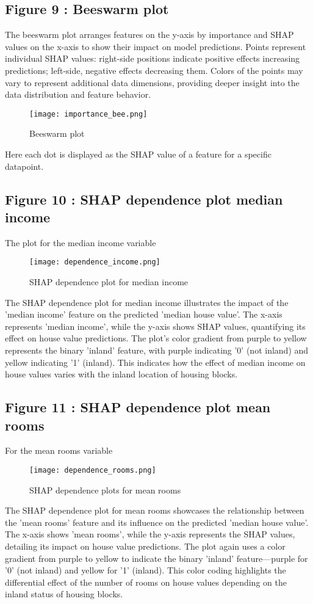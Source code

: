 \documentclass[12pt]{article}
\begin{document}
\newpage
\subsection{Figure 9 : Beeswarm plot}
The beeswarm plot arranges features on the y-axis by importance and SHAP values on the x-axis to show their impact on model predictions. Points represent individual SHAP values: right-side positions indicate positive effects increasing predictions; left-side, negative effects decreasing them. Colors of the points may vary to represent additional data dimensions, providing deeper insight into the data distribution and feature behavior.
\begin{figure}[H]
	\centering
	\texttt{[image: importance\_bee.png]}
	\caption{Beeswarm plot}
	\label{fig:shapbee}
\end{figure}
Here each dot is displayed as the SHAP value of a feature for a specific datapoint. 

\newpage

\subsection{Figure 10 : SHAP dependence plot median income}
The plot for the median income variable
\begin{figure}[H]
	\centering
	\texttt{[image: dependence\_income.png]}
	\caption{SHAP dependence plot for median income}
	\label{fig:depincome}
\end{figure}
The SHAP dependence plot for median income illustrates the impact of the 'median income' feature on the predicted 'median house value'. The x-axis represents 'median income', while the y-axis shows SHAP values, quantifying its effect on house value predictions. The plot's color gradient from purple to yellow represents the binary 'inland' feature, with purple indicating '0' (not inland) and yellow indicating '1' (inland). This indicates how the effect of median income on house values varies with the inland location of housing blocks.

\newpage

\subsection{Figure 11 : SHAP dependence plot mean rooms}
For the mean rooms variable
\begin{figure}[H]
	\centering
	\texttt{[image: dependence\_rooms.png]}
	\caption{SHAP dependence plots for mean rooms}
	\label{fig:deproom}
\end{figure}
The SHAP dependence plot for mean rooms showcases the relationship between the 'mean rooms' feature and its influence on the predicted 'median house value'. The x-axis shows 'mean rooms', while the y-axis represents the SHAP values, detailing its impact on house value predictions.
 The plot again uses a color gradient from purple to yellow to indicate the binary 'inland' feature—purple for '0' (not inland) and yellow for '1' (inland). 
 This color coding highlights the differential effect of the number of rooms on house values depending on the inland status of housing blocks. 
 
\end{document}
